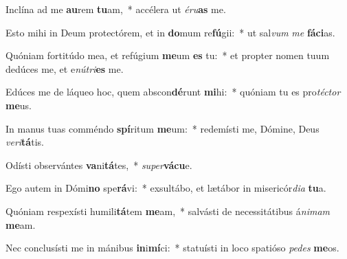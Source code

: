 \item Inclína ad me \textbf{au}rem \textbf{tu}am,~* accélera ut \textit{é}\textit{ru}\textbf{as} me.
\item Esto mihi in Deum protectórem, et in \textbf{do}mum re\textbf{fú}gii:~* ut sal\textit{vum} \textit{me} \textbf{fá}\textbf{ci}as.
\item Quóniam fortitúdo mea, et refúgium \textbf{me}um \textbf{es} tu:~* et propter nomen tuum dedúces me, et e\textit{nú}\textit{tri}\textbf{es} me.
\item Edúces me de láqueo hoc, quem abscon\textbf{dé}runt \textbf{mi}hi:~* quóniam tu es pro\textit{téc}\textit{tor} \textbf{me}us.
\item In manus tuas comméndo \textbf{spí}ritum \textbf{me}um:~* redemísti me, Dómine, Deus \textit{ve}\textit{ri}\textbf{tá}tis.
\item Odísti observántes \textbf{va}ni\textbf{tá}tes,~* \textit{su}\textit{per}\textbf{vá}\textbf{cu}e.
\item Ego autem in Dómi\textbf{no} spe\textbf{rá}vi:~* exsultábo, et lætábor in misericór\textit{di}\textit{a} \textbf{tu}a.
\item Quóniam respexísti humili\textbf{tá}tem \textbf{me}am,~* salvásti de necessitátibus á\textit{ni}\textit{mam} \textbf{me}am.
\item Nec conclusísti me in mánibus \textbf{in}i\textbf{mí}ci:~* statuísti in loco spatióso \textit{pe}\textit{des} \textbf{me}os.
